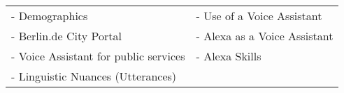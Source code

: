 %





\begin{table}[H]
	\begin{tabular} {l l}
		
		
- Demographics &
-	Use of a Voice Assistant \\	  
-	Berlin.de City Portal &
- 	Alexa as a Voice Assistant \\
-	Voice Assistant for public services  &
 -	Alexa Skills \\
-	Linguistic Nuances (Utterances)\\
	\end{tabular}
\end{table}
%
%
%
%
%
%		


%
%




%
%


%	



